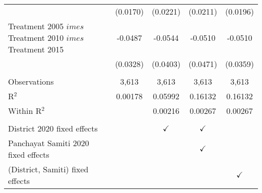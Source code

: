 \begin{tabular}{lcccc}
                                                                     & (0.0170)       & (0.0221)      & (0.0211)      & (0.0196)\\   
   Treatment 2005 $	imes $ Treatment  2010 $	imes $ Treatment 2015 & -0.0487        & -0.0544       & -0.0510       & -0.0510\\   
                                                                     & (0.0328)       & (0.0403)      & (0.0471)      & (0.0359)\\   
    \\
   Observations                                                      & 3,613          & 3,613         & 3,613         & 3,613\\  
   R$^2$                                                             & 0.00178        & 0.05992       & 0.16132       & 0.16132\\  
   Within R$^2$                                                      &                & 0.00216       & 0.00267       & 0.00267\\  
    \\
   District 2020 fixed effects                                       &                & $\checkmark$  & $\checkmark$  & \\  
   Panchayat Samiti 2020 fixed effects                               &                &               & $\checkmark$  & \\  
   (District, Samiti) fixed effects                                  &                &               &               & $\checkmark$\\   
   \bottomrule
\end{tabular}
\par\endgroup


